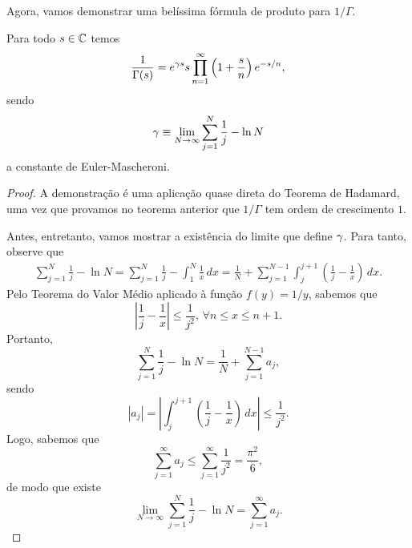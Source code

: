     Agora, vamos demonstrar uma belíssima fórmula de produto para $1/\Gamma$.
    \begin{teorema}
    \label{teo-form-prod-inv-gama}
        Para todo $s\in\mathbb{C}$ temos
        \[
        \frac{1}{\Gamma(s)} = e^{\gamma s}s\prod_{n=1}^{\infty} \left( 1 + \frac{s}{n} \right)e^{-s/n},
        \]
        sendo
        \[
        \gamma \equiv \lim_{N\to\infty} \sum_{j=1}^N \frac{1}{j} - \ln N
        \]
        a constante de Euler-Mascheroni.
    \end{teorema}
    \begin{proof}
        A demonstração é uma aplicação quase direta do Teorema de Hadamard, uma vez que provamos
        no teorema anterior que $1/\Gamma$ tem ordem de crescimento $1$.
        
        Antes, entretanto, vamos mostrar a existência do limite que define $\gamma$. Para tanto,
        observe que
        \begin{align*}
            \sum_{j=1}^N \frac{1}{j} - \ln N 
            = \sum_{j=1}^N \frac{1}{j} - \int_1^N \frac{1}{x} \, dx
            = \frac{1}{N} + \sum_{j=1}^{N-1} \int_j^{j+1} \left(\frac{1}{j} - \frac{1}{x}\right) \, dx.
        \end{align*}
        Pelo Teorema do Valor Médio aplicado à função $f(y) = 1/y$, sabemos que
        \[
        \left| \frac{1}{j} - \frac{1}{x} \right| \leq \frac{1}{j^2}, \, \forall n\leq x\leq n+1.
        \]
        Portanto,
        \[
        \sum_{j=1}^N \frac{1}{j} - \ln N = \frac{1}{N} + \sum_{j=1}^{N-1} a_j,
        \]
        sendo
        \[
        |a_j| = \left| \int_j^{j+1} \left(\frac{1}{j} - \frac{1}{x}\right) \, dx \right| \leq \frac{1}{j^2}.
        \]
        Logo, sabemos que
        \[
        \sum_{j=1}^{\infty} a_j \leq \sum_{j=1}^{\infty} \frac{1}{j^2} = \frac{\pi^2}{6},
        \]
        de modo que existe
        \[
        \lim_{N\to\infty} \sum_{j=1}^N \frac{1}{j} - \ln N = \sum_{j=1}^{\infty} a_j.
        \]
        

\end{proof}
